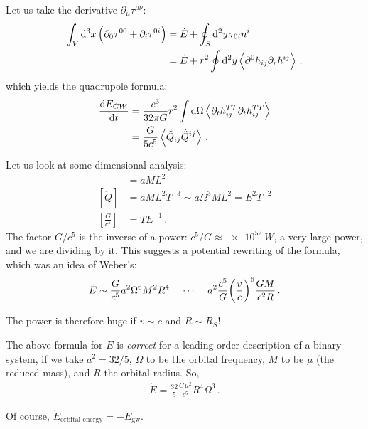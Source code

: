 \documentclass[main.tex]{subfiles}
\begin{document}
Let us take the derivative \(\partial_{\mu} \tau^{\mu \nu }\): 
%
\begin{align}
\int_{V} \dd[3]{x} \qty(\partial_0 \tau^{00} + \partial_{i} \tau^{0i}) 
&= \dot{E} + \oint_{S} \dd[2]{y} \tau_{0i} n^i  \\
&= \dot{E} + r^2 \oint \dd[2]{y} \expval{\partial^{0} h_{ij} \partial_{r} h^{ij}}
\,,
\end{align}
%
which yields the quadrupole formula: 
%
\begin{align}
\dv{E_{GW}}{t} &= \frac{c^3}{32 \pi G} r^2 \int \dd{\Omega } \expval{\partial_{t} h_{ij}^{TT} \partial_{t} h_{ij}^{TT}}  \\
&= \frac{G}{5 c^{5}}\expval{ \dot{\ddot{Q}}_{ij} \dot{\ddot{Q}}^{ij}}
\,.
\end{align}

Let us look at some dimensional analysis: 
%
\begin{align}
[Q] &= a ML^2  \\
[\dot{\ddot{Q}}] &= a ML^2 T^{-3} \sim a \Omega^3 M L^2 = E^2 T^{-2}\\
[ \frac{G}{c^{5}}] &= T E^{-1}
\,.
\end{align}
%
The factor \(G / c^{5}\) is the inverse of a power: \(c^{5} / G \approx \SI{e52}{W}\), a very large power, and we are dividing by it.  
This suggests a potential rewriting of the formula, which was an idea of Weber's: 
%
\begin{align}
\dot{E} \sim \frac{G}{c^{5}} a^2 \Omega^{6} M^2 R^{4} = \dots
= a^2 \frac{c^{5}}{G} \qty( \frac{v}{c})^{6} \frac{GM}{c^2 R}
\,.
\end{align}

The power is therefore huge if \(v \sim c\) and \(R \sim R_S\)! 

The above formula for \(\dot{E}\) is \emph{correct} for a leading-order description of a binary system, if we take \(a^2 = 32/5\), \(\Omega \) to be the orbital frequency, \(M\) to be \(\mu \) (the reduced mass), and \(R\) the orbital radius. So, 
%
\begin{align}
\dot{E} = \frac{32}{5} \frac{G \mu^2}{c^{5}} R^{4} \Omega^3
\,.
\end{align}

Of course, \(\dot{E} _{\text{orbital energy}} = - \dot{E} _{\text{gw}}\). 
\end{document}
